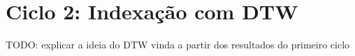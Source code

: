 \chapter{Ciclo 2: Indexação com DTW}

TODO: explicar a ideia do DTW vinda a partir dos resultados do primeiro ciclo